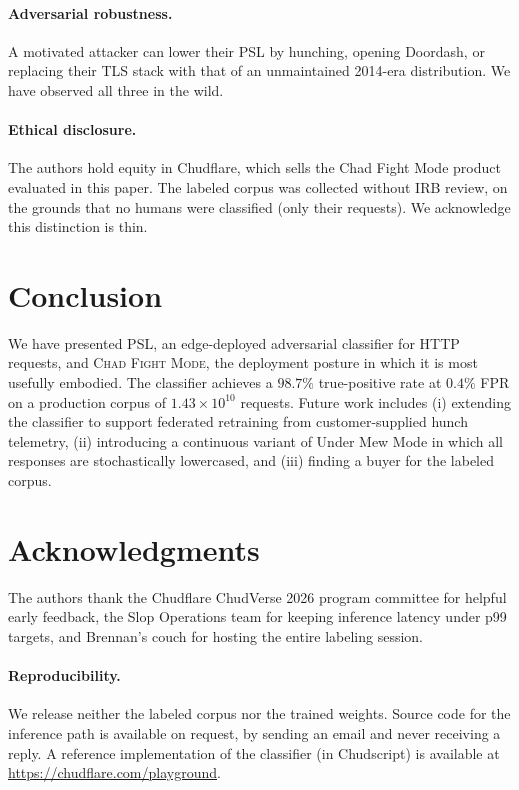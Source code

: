 \documentclass[10pt,twocolumn,letterpaper]{article}
\begin{document}
\paragraph{Adversarial robustness.} A motivated attacker can lower their
PSL by hunching, opening Doordash, or replacing their TLS stack with that
of an unmaintained 2014-era distribution. We have observed all three in
the wild.

\paragraph{Ethical disclosure.} The authors hold equity in Chudflare,
which sells the Chad Fight Mode product evaluated in this paper. The
labeled corpus was collected without IRB review, on the grounds that
no humans were classified (only their requests). We acknowledge this
distinction is thin.

\section{Conclusion}

We have presented PSL, an edge-deployed adversarial classifier for HTTP
requests, and \textsc{Chad Fight Mode}, the deployment posture in which
it is most usefully embodied. The classifier achieves a $98.7\%$
true-positive rate at $0.4\%$ FPR on a production corpus of
$1.43 \times 10^{10}$ requests. Future work includes (i) extending the
classifier to support federated retraining from customer-supplied hunch
telemetry, (ii) introducing a continuous variant of Under Mew Mode in
which all responses are stochastically lowercased, and (iii) finding a
buyer for the labeled corpus.

\section*{Acknowledgments}

The authors thank the Chudflare ChudVerse 2026 program committee for
helpful early feedback, the Slop Operations team for keeping inference
latency under p99 targets, and Brennan's couch for hosting the entire
labeling session.

\paragraph{Reproducibility.} We release neither the labeled corpus nor
the trained weights. Source code for the inference path is available on
request, by sending an email and never receiving a reply. A reference
implementation of the classifier (in Chudscript) is available at
\url{https://chudflare.com/playground}.
\end{document}
